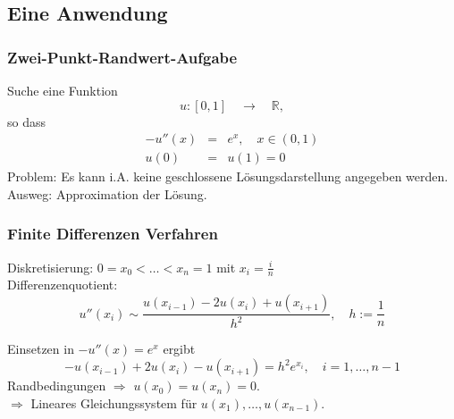 \subsection{Eine Anwendung}
%
%
\begin{frame}[fragile]\frametitle{Zwei-Punkt-Randwert-Aufgabe}

Suche eine Funktion 
\begin{equation*}
u:[0,1] \quad \rightarrow \quad \mathbb{R}, 
\end{equation*}
so dass 
\begin{eqnarray*}
-u''(x) & = & e^x, \quad x \in (0,1)\\
u(0) & = & u(1) =0
\end{eqnarray*}
\alert{Problem:} Es kann i.A. keine geschlossene
Lösungsdarstellung angegeben werden. \\ %

\alert{Ausweg:} Approximation der Lösung. 
\end{frame}
%
%
\begin{frame}[fragile]\frametitle{Finite Differenzen Verfahren}

Diskretisierung: $0=x_0 < \dots < x_{n}=1$ mit $x_i=\frac{i}{n}$\\

Differenzenquotient: 
\[ u''(x_i) \sim \frac{u(x_{i-1}) - 2 u(x_i) + u(x_{i+1})}{ 
  h^2}, \quad h:=\frac{1}{n} \]

Einsetzen in $-u''(x)=e^x$ ergibt 
\[ -u(x_{i-1}) + 2 u(x_i) - u(x_{i+1}) =  h^2 e^{x_i}, \quad
i=1,\dots ,n-1 \] 
Randbedingungen $\Rightarrow $ $u(x_0)=u(x_n)=0$.\\

$\Rightarrow$ Lineares Gleichungssystem für 
$u(x_1), \dots ,u(x_{n-1})$.
\end{frame}


